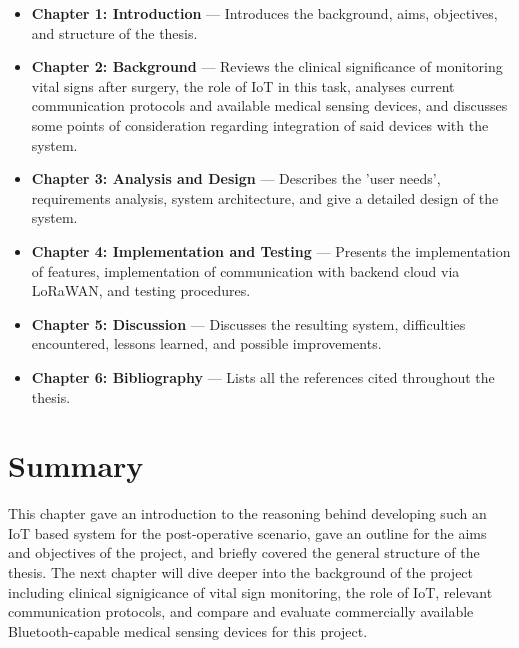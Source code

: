 \begin{itemize}
	\item \textbf{Chapter 1: Introduction} --- Introduces the background, aims, objectives, and structure of the thesis.
	\item \textbf{Chapter 2: Background} --- Reviews the clinical significance of monitoring vital signs after surgery, the role of IoT in this task, analyses current communication protocols and available medical sensing devices, and discusses some points of consideration regarding integration of said devices with the system.
	\item \textbf{Chapter 3: Analysis and Design} --- Describes the 'user needs', requirements analysis, system architecture, and give a detailed design of the system.
	\item \textbf{Chapter 4: Implementation and Testing} --- Presents the implementation of features, implementation of communication with backend cloud via LoRaWAN, and testing procedures.
	\item \textbf{Chapter 5: Discussion} --- Discusses the resulting system, difficulties encountered, lessons learned, and possible improvements.
	\item \textbf{Chapter 6: Bibliography} --- Lists all the references cited throughout the thesis.
\end{itemize}

\section{Summary} %
This chapter gave an introduction to the reasoning behind developing such an IoT based system for the post-operative scenario, gave an outline for the aims and objectives of the project, and briefly covered the general structure of the thesis. The next chapter will dive deeper into the background of the project including clinical signigicance of vital sign monitoring, the role of IoT, relevant communication protocols, and compare and evaluate commercially available Bluetooth-capable medical sensing devices for this project.
